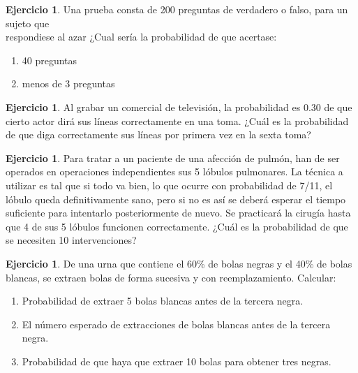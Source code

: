 \documentclass[]{article}
\providecommand{\tightlist}{%
  \setlength{\itemsep}{0pt}\setlength{\parskip}{0pt}}
\theoremstyle{plain}
\theoremstyle{definition}
\newtheorem{exercise}[theorem]{Ejercicio}
\theoremstyle{definition} %
\begin{document}
\begin{exercise}

  Una prueba consta de 200 preguntas de verdadero o falso, para un
  sujeto que\\
  respondiese al azar ¿Cual sería la probabilidad de que acertase:

  \begin{enumerate}
  \def\labelenumii{\arabic{enumii}.}
  \tightlist
  \item
    40 preguntas
  \item
    menos de 3 preguntas 
  \end{enumerate}

\end{exercise}
\begin{exercise}

  Al grabar un comercial de televisión, la probabilidad es 0.30 de que
  cierto actor dirá sus líneas correctamente en una toma. ¿Cuál es la
  probabilidad de que diga correctamente sus líneas por primera vez en
  la sexta toma?

\end{exercise}

\begin{exercise}
  Para tratar a un paciente de una afección de pulmón, han de ser
  operados en operaciones independientes sus 5 lóbulos pulmonares. La
  técnica a utilizar es tal que si todo va bien, lo que ocurre con
  probabilidad de 7/11, el lóbulo queda definitivamente sano, pero si no
  es así se deberá esperar el tiempo suficiente para intentarlo
  posteriormente de nuevo. Se practicará la cirugía hasta que 4 de sus 5
  lóbulos funcionen correctamente. ¿Cuál es la probabilidad de que se
  necesiten 10 intervenciones? 
\end{exercise}

\begin{exercise}
  De una urna que contiene el 60\% de bolas negras y el 40\% de bolas
  blancas, se extraen bolas de forma sucesiva y con reemplazamiento.
  Calcular:

  \begin{enumerate}
  \def\labelenumii{\arabic{enumii}.}
  \tightlist
  \item
    Probabilidad de extraer 5 bolas blancas antes de la tercera negra.\\
  \item El número esperado de extracciones de bolas blancas antes de la tercera negra.\\
  \item Probabilidad de que haya que extraer 10 bolas para obtener tres
    negras.
  \end{enumerate}
\end{exercise}
\end{document}

